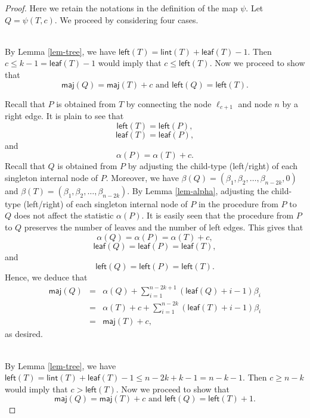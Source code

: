 \documentclass[10pt,a4paper]{amsart}
\def\l{\mathsf{left}}
\def\leaf{\mathsf{leaf}}
\def\lint{\mathsf{lint}}
\def\maj{\mathsf{maj}}
\begin{document}
	 		\begin{proof}
	 			Here we retain the notations in the definition of the map $\psi$. Let $Q=\psi(T,c)$.   We proceed  by considering  four cases.
	 			
	 			\\
	 			By Lemma \ref{lem-tree}, we have $\l(T)=\lint(T)+\leaf(T)-1$.  Then $c\leq k-1=\leaf(T)-1$ would imply that $c\leq \l(T)$.  Now we proceed to show that 
	 			$$
	 			\maj(Q)=\maj(T)+c \,\, \mbox{and}\,\, \l(Q)=\l(T).
	 			$$
	 		 
	 			Recall that $P$ is obtained from $T$ by connecting the node $\ell_{c+1}$ and node $n$ by a right edge.  It is plain to see that $$\l(T)=\l(P),$$ $$\leaf(T)=\leaf(P),$$   and $$\alpha(P)=\alpha(T)+c.$$  
	 			Recall that $Q$ is obtained from $P$ by adjusting the child-type (left/right)   of each singleton internal node of $P$.  Moreover, we have  $\beta(Q)=(\beta_1, \beta_2, \ldots, \beta_{n-2k}, 0)$ and $\beta(T)=(\beta_1, \beta_2, \ldots, \beta_{n-2k})$.  By Lemma \ref{lem-alpha},   adjusting the child-type (left/right)   of each singleton internal node of $P$ in the procedure from $P$ to $Q$ does not affect the statistic $\alpha(P)$.   It is easily seen that the procedure from $P$ to $Q$ preserves the number of leaves and the number of left edges. This gives that  $$\alpha(Q)=\alpha(P)=\alpha(T)+c,$$
	 			 $$\leaf(Q)=\leaf(P)=\leaf(T),$$
	 			 and $$\l(Q)=\l(P)=\l(T).
	 			 $$
	 			  Hence, we deduce that
	 			 $$
	 			 \begin{array}{lll}
	 			 \maj(Q)&=&\alpha(Q)+\sum\limits_{i=1}^{n-2k+1}(\leaf(Q)+i-1)\beta_i\\
	 			 &=&\alpha(T)+c+\sum\limits_{i=1}^{n-2k}(\leaf(T)+i-1)\beta_i\\
	 			 &=& \maj(T)+c,
	 			 \end{array}
	 			 $$
	 			as desired.
	 			
	 		 
	 		 	\\
	 		 By Lemma \ref{lem-tree}, we have $\l(T)=\lint(T)+\leaf(T)-1\leq n-2k+k-1=n-k-1$.  Then $c\geq n-k$ would imply that $c> \l(T)$.  Now we proceed to show that 
	 		 $$
	 		 \maj(Q)=\maj(T)+c \,\, \mbox{and}\,\, \l(Q)=\l(T)+1.
	 		 $$
	 		 

\end{proof}
\end{document}
